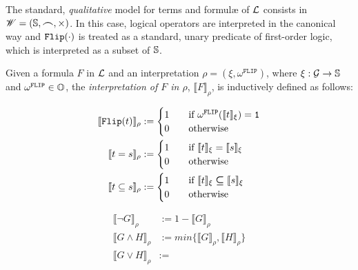The standard, \emph{qualitative}
model for terms and formul\ae{}
of $\mathcal{L}$ consists in
$\mathscr{W} = (\mathbb{S}, \bm{\frown}, \times)$.
In this case, logical operators are interpreted
in the canonical way and
$\mathtt{Flip}(\cdot)$
is treated as a standard, unary predicate
of first-order logic, which is interpreted
as a subset of $\mathbb{S}$.

\begin{defn}
  \label{def:qualsem}
Given a formula $F$ in $\mathcal{L}$
and an interpretation $\rho
=(\xi,\omega^{\mathtt{FLIP}})$, where $\xi :\mathcal{G}\rightarrow
\mathbb{S}$ and $\omega^{\mathtt{FLIP}} \in \mathbb{O}$,
the \emph{interpretation of $F$ in $\rho$},
$\llbracket F\rrbracket_\rho$,
is inductively defined as follows:

\begin{minipage}{\linewidth}
\begin{minipage}[t]{0.4\linewidth}
\begin{align*}
\llbracket \Flip(t)\rrbracket_\rho &:=
\begin{cases}
1 \ \ \ &\text{if } \omega^{\mathtt{FLIP}}(\llbracket t\rrbracket_\xi)
=\oone \\
0 \ \ \ &\text{otherwise}
\end{cases} \\
%
\llbracket t=s\rrbracket_{\rho} &:=
\begin{cases}
1 \ \ \ &\text{if } \llbracket t\rrbracket_{\xi}
= \llbracket s\rrbracket_\xi \\
0 \ \ \ &\text{otherwise} \\
\end{cases} \\
%
\llbracket t\subseteq s\rrbracket_\rho
&:=
\begin{cases}
1 \ \ \ &\text{if } \llbracket t\rrbracket_\xi \ssubseteq
\llbracket s\rrbracket_\xi \\
0 \ \ \ &\text{otherwise}
\end{cases}
\end{align*}
\end{minipage}
\hfill
\begin{minipage}[t]{0.5\linewidth}
\begin{align*}
\llbracket \neg G\rrbracket_\rho &:= 1 -
\llbracket G\rrbracket_\rho \\
%
\llbracket G\wedge H\rrbracket_\rho &:=
min\{\llbracket G\rrbracket_\rho, \llbracket H\rrbracket_\rho\} \\
%
\llbracket G\vee H\rrbracket_\rho &:=

\end{align*}
\end{minipage}
\end{minipage}
\end{defn}
